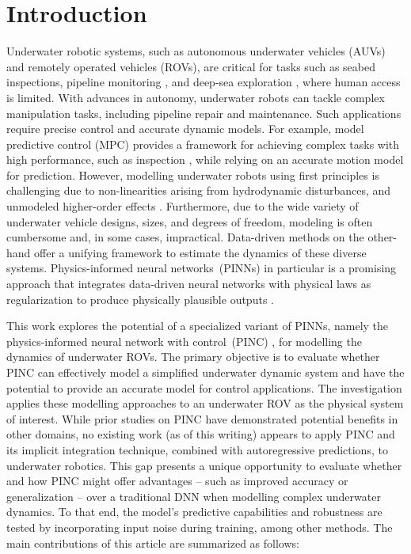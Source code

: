 \section{Introduction} %
Underwater robotic systems, such as autonomous underwater vehicles (AUVs) and remotely operated vehicles (ROVs), are critical for tasks such as seabed inspections, pipeline monitoring \cite{amer2023unav}, and deep-sea exploration \cite{kunz2008deep}, where human access is limited. With advances in autonomy, underwater robots can tackle complex manipulation tasks, including pipeline repair and maintenance. 
%
%
Such applications require precise control and accurate dynamic models. For example, model predictive control (MPC) provides a framework for achieving complex tasks with high performance, such as inspection \cite{amer2023visual}, while relying on an accurate motion model for prediction. However, modelling underwater robots using first principles is challenging due to non-linearities arising from hydrodynamic disturbances, and unmodeled higher-order effects \cite{lakshminarayanan2024estimation}. Furthermore, due to the wide variety of underwater vehicle designs, sizes, and degrees of freedom, modeling is often cumbersome and, in some cases, impractical. Data-driven methods on the other-hand offer a unifying framework to estimate the dynamics of these diverse systems.
%
Physics-informed neural networks~(PINNs) in particular is a promising approach that integrates data-driven neural networks with physical laws as regularization to produce physically plausible outputs \cite{karniadakis2021physics}. 

%
This work explores the potential of a specialized variant of PINNs, namely the physics-informed neural network with control~(PINC) \cite{antonelo_physics-informed_2024}, for modelling the dynamics of underwater ROVs. The primary objective is to evaluate whether PINC can effectively model a simplified underwater dynamic system and have the potential to provide an accurate model for control applications.
The investigation applies these modelling approaches to an underwater ROV as the physical system of interest. While prior studies on PINC have demonstrated potential benefits in other domains, no existing work (as of this writing) appears to apply PINC and its implicit integration technique, combined with autoregressive predictions, to underwater robotics. This gap presents a unique opportunity to evaluate whether and how PINC might offer advantages -- such as improved accuracy or generalization -- over a traditional DNN when modelling complex underwater dynamics. To that end, the model’s predictive capabilities and robustness are tested by incorporating input noise during training, among other methods. The main contributions of this article are summarized as follows:

